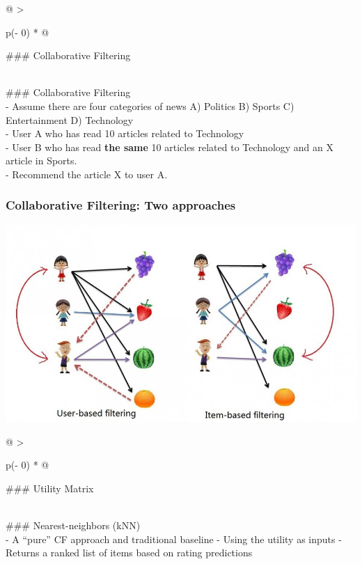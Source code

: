 \documentclass[
]{article}
\begin{document}
\begin{longtable}[]{@{}
  >{\raggedright\arraybackslash}p{(\columnwidth - 0\tabcolsep) * }@{}}
\toprule
\begin{minipage}[b]{\linewidth}\raggedright
\#\#\# Collaborative Filtering
\end{minipage} \\
\midrule
\endhead
\#\#\# Collaborative Filtering \\
- Assume there are four categories of news A) Politics B) Sports C)
Entertainment D) Technology \\
- User A who has read 10 articles related to Technology \\
- User B who has read \textbf{the same} 10 articles related to
Technology and an X article in Sports. \\
- Recommend the article X to user A. \\
\bottomrule
\end{longtable}

\hypertarget{collaborative-filtering-two-approaches}{%
\subsubsection{Collaborative Filtering: Two
approaches}\label{collaborative-filtering-two-approaches}}

\includegraphics{images/rs7.png}

\begin{longtable}[]{@{}
  >{\raggedright\arraybackslash}p{(\columnwidth - 0\tabcolsep) * }@{}}
\toprule
\begin{minipage}[b]{\linewidth}\raggedright
\#\#\# Utility Matrix
\end{minipage} \\
\midrule
\endhead
\#\#\# Nearest-neighbors (kNN) \\
- A ``pure'' CF approach and traditional baseline - Using the utility as
inputs - Returns a ranked list of items based on rating predictions \\
\bottomrule
\end{longtable}
\end{document}
